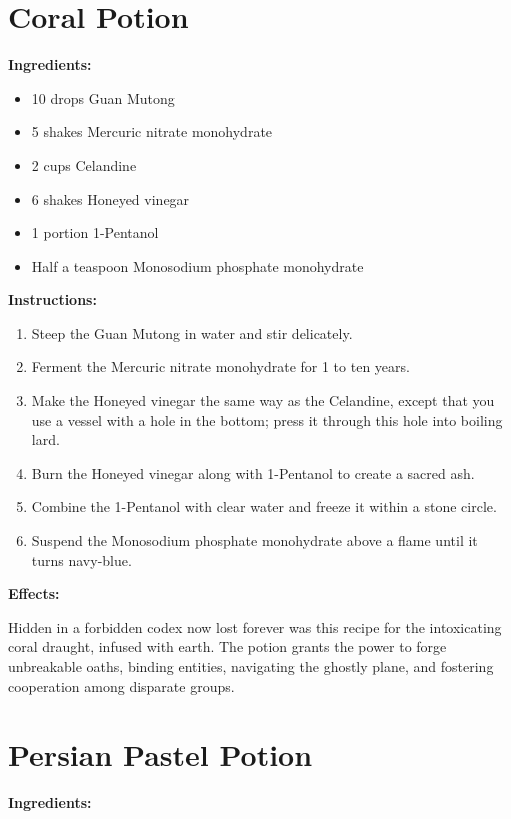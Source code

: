 \documentclass{article}
\begin{document}
\newpage
\section*{Coral Potion}

\textbf{Ingredients:}

\begin{itemize}
  \item 10 drops Guan Mutong
  \item 5 shakes Mercuric nitrate monohydrate
  \item 2 cups Celandine
  \item 6 shakes Honeyed vinegar
  \item 1 portion 1-Pentanol
  \item Half a teaspoon Monosodium phosphate monohydrate
\end{itemize}

\textbf{Instructions:}

\begin{enumerate}
  \item Steep the Guan Mutong in water and stir delicately.
  \item Ferment the Mercuric nitrate monohydrate for 1 to ten years.
  \item Make the Honeyed vinegar the same way as the Celandine, except that you use a vessel with a hole in the bottom; press it through this hole into boiling lard.
  \item Burn the Honeyed vinegar along with 1-Pentanol to create a sacred ash.
  \item Combine the 1-Pentanol with clear water and freeze it within a stone circle.
  \item Suspend the Monosodium phosphate monohydrate above a flame until it turns navy-blue.
\end{enumerate}

\textbf{Effects:}

Hidden in a forbidden codex now lost forever was this recipe for the intoxicating coral draught, infused with earth. The potion grants the power to forge unbreakable oaths, binding entities, navigating the ghostly plane, and fostering cooperation among disparate groups.

\newpage
\section*{Persian Pastel Potion}

\textbf{Ingredients:}
\end{document}

